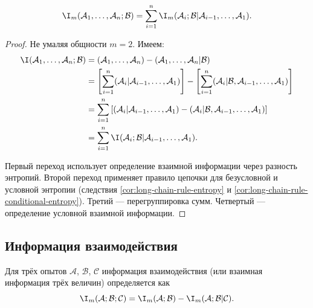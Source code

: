 \begin{proposition}
	\[
		\I_m(\mathcal{A}_1, \ldots, \mathcal{A}_n ; \mathcal{B}) = \sum_{i = 1}^n \I_m(\mathcal{A}_i; \mathcal{B} | \mathcal{A}_{i-1}, \ldots, \mathcal{A}_1).
	\]
\end{proposition}
\begin{proof}
	Не умаляя общности $m = 2$. Имеем:
	\begin{align*}
		\I(\mathcal{A}_1, \ldots, \mathcal{A}_n; \mathcal{B}) 
		&= \H(\mathcal{A}_1, \ldots, \mathcal{A}_n) - \H(\mathcal{A}_1, \ldots, \mathcal{A}_n | \mathcal{B}) \\
		&= \left[ \sum_{i=1}^n \H(\mathcal{A}_i | \mathcal{A}_{i-1}, \ldots, \mathcal{A}_1) \right] - \left[ \sum_{i=1}^n \H(\mathcal{A}_i | \mathcal{B}, \mathcal{A}_{i-1}, \ldots, \mathcal{A}_1) \right] \\
		&= \sum_{i=1}^n \left[ \H(\mathcal{A}_i | \mathcal{A}_{i-1}, \ldots, \mathcal{A}_1) - \H(\mathcal{A}_i | \mathcal{B}, \mathcal{A}_{i-1}, \ldots, \mathcal{A}_1) \right] \\
		&= \sum_{i=1}^n \I(\mathcal{A}_i; \mathcal{B} | \mathcal{A}_{i-1}, \ldots, \mathcal{A}_1).
	\end{align*}
	
	Первый переход использует определение взаимной информации через разность энтропий. Второй переход применяет правило цепочки для безусловной и условной энтропии (следствия \ref{cor:long-chain-rule-entropy} и \ref{cor:long-chain-rule-conditional-entropy}). Третий --- перегруппировка сумм. Четвертый --- определение условной взаимной информации.
\end{proof}

\subsection{Информация взаимодействия}

\begin{definition}
	Для трёх опытов $\mathcal{A}$, $\mathcal{B}$, $\mathcal{C}$ информация взаимодействия (или взаимная информация трёх величин) определяется как
	\[
		\I_m(\mathcal{A}; \mathcal{B}; \mathcal{C}) = \I_m(\mathcal{A}; \mathcal{B}) - \I_m(\mathcal{A}; \mathcal{B} | \mathcal{C}).
	\]
\end{definition}

